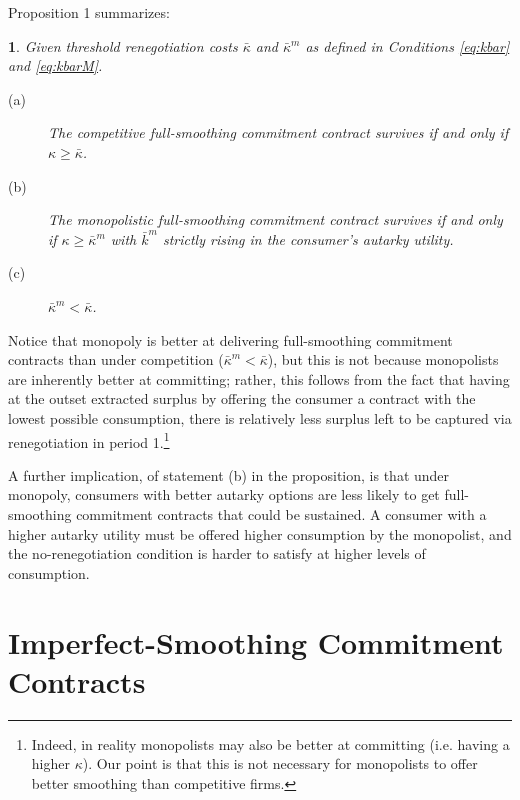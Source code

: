 \documentclass[11pt,english]{article}
\theoremstyle{plain}
\newtheorem{prop}{\protect\propositionname}
\theoremstyle{definition}
\providecommand{\propositionname}{Proposition}
\begin{document}
Proposition 1 summarizes: 
\begin{prop}
\label{Prop:full-commit} Given threshold renegotiation costs $\bar{\kappa}$
and $\bar{\kappa}^{m}$ as defined in Conditions \ref{eq:kbar} and
\ref{eq:kbarM}. 
\begin{description}
\item [{(a)}] The competitive full-smoothing commitment contract survives
if and only if $\kappa\geq$$\bar{\kappa}$. 
\item [{(b)}] The monopolistic full-smoothing commitment contract survives
if and only if $\kappa\geq$$\bar{\kappa}^{m}$ with $\bar{k}^{m}$
strictly rising in the consumer's autarky utility. 
\item [{(c)}] $\bar{\kappa}^{m}<\bar{\kappa}$. 
\end{description}
\end{prop}
Notice that monopoly is better at delivering full-smoothing commitment
contracts than under competition ($\bar{\kappa}^{m}<\bar{\kappa}$),
but this is not because monopolists are inherently better at committing;
rather, this follows from the fact that having at the outset extracted
surplus by offering the consumer a contract with the lowest possible
consumption, there is relatively less surplus left to be captured
via renegotiation in period 1.\footnote{Indeed, in reality monopolists may also be better at committing (i.e.
having a higher $\kappa$). Our point is that this is not necessary
for monopolists to offer better smoothing than competitive firms.}

A further implication, of statement (b) in the proposition, is that
under monopoly, consumers with better autarky options are less likely
to get full-smoothing commitment contracts that could be sustained.
A consumer with a higher autarky utility must be offered higher consumption
by the monopolist, and the no-renegotiation condition is harder to
satisfy at higher levels of consumption.

\section{Imperfect-Smoothing Commitment Contracts }

\label{sec:imperfectK}
\end{document}

